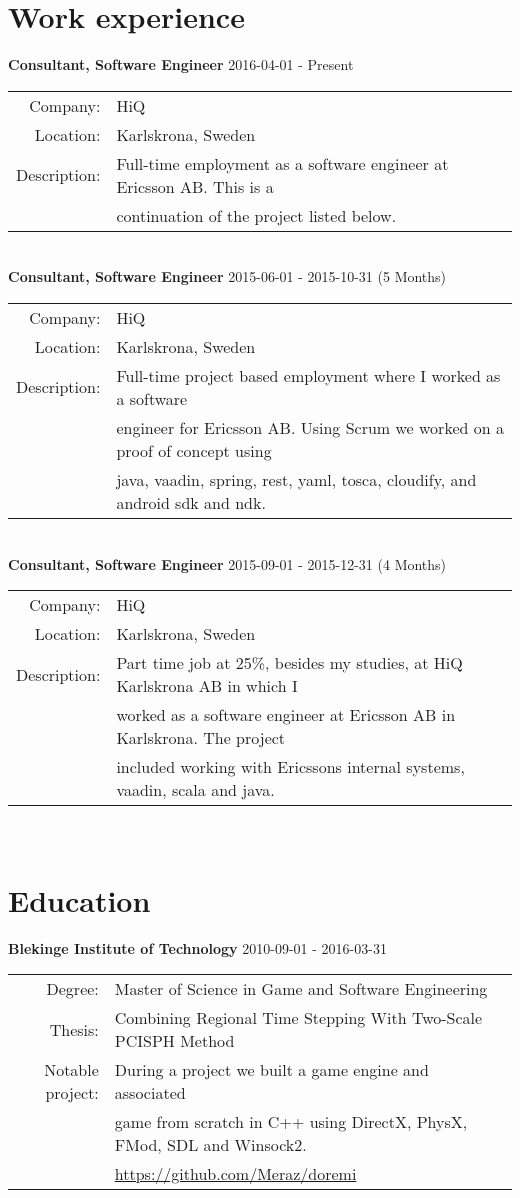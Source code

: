 \documentclass[a4paper,10pt]{article}
\begin{document}
\section{Work experience}
\textbf{Consultant, Software Engineer} 2016-04-01 - Present \\
\begin{tabular}{rl}
Company:& HiQ \\
Location:& Karlskrona, Sweden \\
Description:& Full-time employment as a software engineer at Ericsson AB. This is a\\&
continuation of the project listed below.
\end{tabular}\\

\textbf{Consultant, Software Engineer} 2015-06-01 - 2015-10-31 (5 Months)\\
\begin{tabular}{rl}
Company:& HiQ \\
Location:& Karlskrona, Sweden \\
Description:& Full-time project based employment where I worked as a software \\&
engineer for Ericsson AB. Using Scrum we worked on a proof of concept using\\& 
java, vaadin, spring, rest, yaml, tosca, cloudify, and android sdk and ndk.\\
\end{tabular}\\

\textbf{Consultant, Software Engineer} 2015-09-01 - 2015-12-31 (4 Months) \\
\begin{tabular}{rl}
Company:& HiQ \\
Location:& Karlskrona, Sweden \\
Description:& Part time job at 25\%, besides my studies, at HiQ Karlskrona AB in which I\\&
worked as a software engineer at Ericsson AB in Karlskrona. The project\\&
included working with Ericssons internal systems, vaadin, scala and java.
\end{tabular}\\


\section{Education}
\textbf{Blekinge Institute of Technology} 2010-09-01 - 2016-03-31 \\
\begin{tabular}{rl}
Degree:&  Master of Science in Game and Software Engineering\\
Thesis:& Combining Regional Time Stepping With Two-Scale PCISPH Method \\
Notable project:& During a project we built a game engine and associated \\
&game from scratch in C++ using DirectX, PhysX, FMod, SDL and Winsock2.\\
& \url{https://github.com/Meraz/doremi}
\end{tabular}\\
\end{document}
